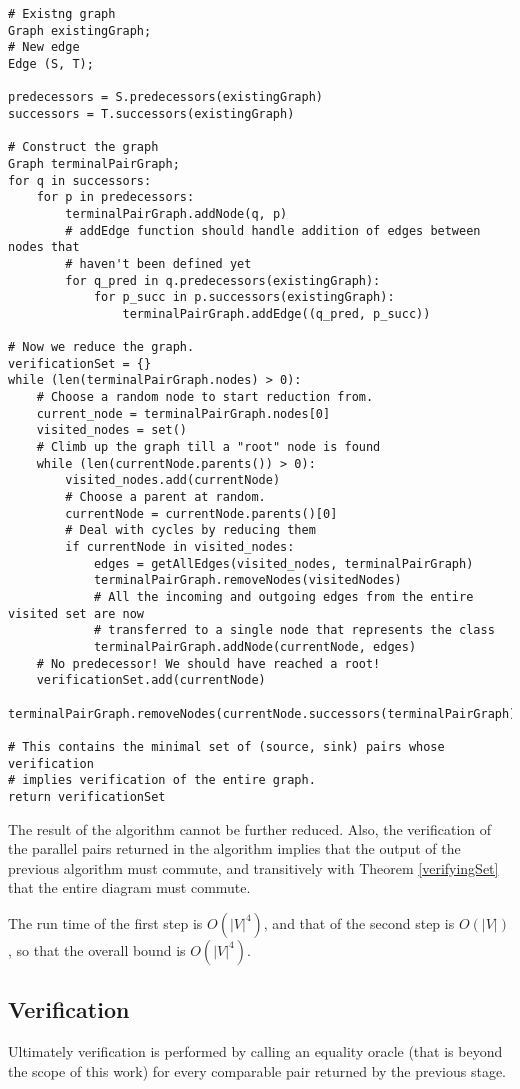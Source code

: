 \documentclass[sigplan,review,anonymous]{acmart}
\begin{document}
\begin{verbatim}
# Existng graph
Graph existingGraph;
# New edge
Edge (S, T);

predecessors = S.predecessors(existingGraph)
successors = T.successors(existingGraph)

# Construct the graph
Graph terminalPairGraph;
for q in successors:
    for p in predecessors:
        terminalPairGraph.addNode(q, p)
        # addEdge function should handle addition of edges between nodes that 
        # haven't been defined yet
        for q_pred in q.predecessors(existingGraph):
            for p_succ in p.successors(existingGraph):
                terminalPairGraph.addEdge((q_pred, p_succ))

# Now we reduce the graph.
verificationSet = {}
while (len(terminalPairGraph.nodes) > 0):
    # Choose a random node to start reduction from.
    current_node = terminalPairGraph.nodes[0]
    visited_nodes = set()
    # Climb up the graph till a "root" node is found
    while (len(currentNode.parents()) > 0):
        visited_nodes.add(currentNode)
        # Choose a parent at random.
        currentNode = currentNode.parents()[0]
        # Deal with cycles by reducing them
        if currentNode in visited_nodes:
            edges = getAllEdges(visited_nodes, terminalPairGraph)
            terminalPairGraph.removeNodes(visitedNodes)
            # All the incoming and outgoing edges from the entire visited set are now 
            # transferred to a single node that represents the class
            terminalPairGraph.addNode(currentNode, edges)
    # No predecessor! We should have reached a root!
    verificationSet.add(currentNode)
    terminalPairGraph.removeNodes(currentNode.successors(terminalPairGraph)

# This contains the minimal set of (source, sink) pairs whose verification 
# implies verification of the entire graph. 
return verificationSet

\end{verbatim}

The result of the algorithm cannot be further reduced. Also, the verification of the parallel pairs returned in the algorithm implies that the output of the previous algorithm must commute, and transitively with Theorem \ref{verifyingSet} that the entire diagram must commute.

The run time of the first step is $O(|V|^4)$, and that of the second step is $O(|V|)$, so that the overall bound is $O(|V|^4)$.

\subsection{Verification}
Ultimately verification is performed by calling an equality oracle (that is beyond the scope of this work) for every comparable pair returned by the previous stage.
\end{document}
